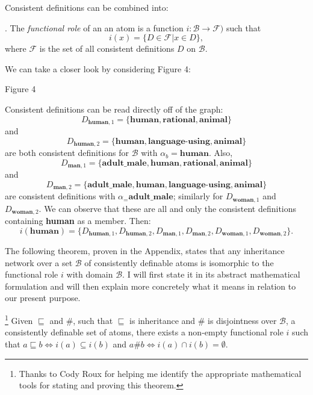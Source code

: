 Consistent definitions can be combined into:
\par\vspace{3mm}
. The \emph{functional role} of an an atom is a function $i:\mathcal{B}\rightarrow\mathcal{F})$ such that
$$i(x)=\{D\in\mathcal{F}\vert x\in D\},$$
where $\mathcal{F}$ is the set of all consistent definitions $D$ on $\mathcal{B}$.

We can take a closer look by considering Figure 4:
\par\vspace{5mm}
\centerline{
}
\centerline{Figure 4}
\par\vspace{5mm}
\noindent Consistent definitions can be read directly off of the graph:
$$D_{\textbf{human},1}=\{\textbf{human},\textbf{rational},\textbf{animal}\}$$
and
$$D_{\textbf{human},2}=\{\textbf{human},\textbf{language-using},\textbf{animal}\}$$ are both consistent definitions for $\mathcal{B}$ with $\alpha_b=\textbf{human}$. Also,
$$D_{\textbf{man},1}=\{\textbf{adult\_male},\textbf{human},\textbf{rational},\textbf{animal}\}$$
and
$$D_{\textbf{man},2}=\{\textbf{adult\_male},\textbf{human},\textbf{language-using},\textbf{animal}\}$$
are consistent definitions with $\alpha_=\textbf{adult\_male}$; similarly for $D_{\textbf{woman},1}$ and $D_{\textbf{woman},2}$. We can observe that these are all and only the consistent definitions containing {\bf human} as a member. Then:
$$i(\textbf{human})=\{D_{\textbf{human},1},D_{\textbf{human},2},D_{\textbf{man},1},D_{\textbf{man},2},D_{\textbf{woman},1},D_{\textbf{woman},2}\}.$$

The following theorem, proven in the Appendix, states that any inheritance network over a set $\mathcal{B}$ of consistently definable atoms is isomorphic to the functional role $i$ with domain $\mathcal{B}$. I will first state it in its abstract mathematical formulation and will then explain more concretely what it means in relation to our present purpose.
\par\vspace{3mm}
\footnote{Thanks to Cody Roux for helping me identify the appropriate mathematical tools for stating and proving this theorem.} Given $\sqsubseteq $ and $\#$,  such that $\sqsubseteq $ is inheritance and $\#$ is disjointness over $\mathcal{B}$, a consistently definable set of atoms, there exists a non-empty functional role $i$ such that $a\sqsubseteq b\Leftrightarrow i(a)\subseteq i(b)$  and $a\#b\Leftrightarrow i(a)\cap i(b)=\emptyset$.
\par\vspace{3mm}
